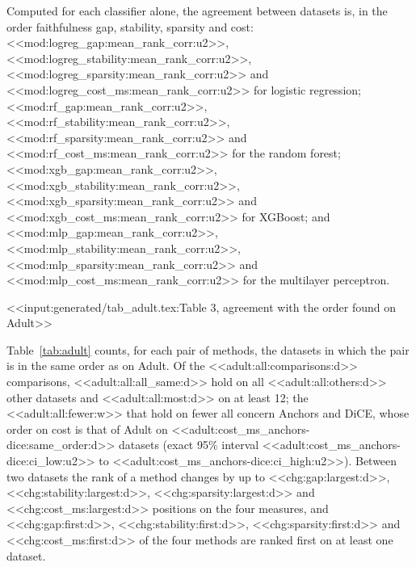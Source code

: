 \documentclass[10pt,a4paper,twocolumn]{article}
\begin{document}
Computed for each classifier alone, the agreement between datasets is, in the order
faithfulness gap, stability, sparsity and cost: <<mod:logreg_gap:mean_rank_corr:u2>>,
<<mod:logreg_stability:mean_rank_corr:u2>>, <<mod:logreg_sparsity:mean_rank_corr:u2>> and
<<mod:logreg_cost_ms:mean_rank_corr:u2>> for logistic regression;
<<mod:rf_gap:mean_rank_corr:u2>>, <<mod:rf_stability:mean_rank_corr:u2>>,
<<mod:rf_sparsity:mean_rank_corr:u2>> and <<mod:rf_cost_ms:mean_rank_corr:u2>> for the
random forest; <<mod:xgb_gap:mean_rank_corr:u2>>, <<mod:xgb_stability:mean_rank_corr:u2>>,
<<mod:xgb_sparsity:mean_rank_corr:u2>> and <<mod:xgb_cost_ms:mean_rank_corr:u2>> for
XGBoost; and <<mod:mlp_gap:mean_rank_corr:u2>>, <<mod:mlp_stability:mean_rank_corr:u2>>,
<<mod:mlp_sparsity:mean_rank_corr:u2>> and <<mod:mlp_cost_ms:mean_rank_corr:u2>> for the
multilayer perceptron.

<<input:generated/tab_adult.tex:Table 3, agreement with the order found on Adult>>

Table~\ref{tab:adult} counts, for each pair of methods, the datasets in which the pair is
in the same order as on Adult. Of the <<adult:all:comparisons:d>> comparisons,
<<adult:all:all_same:d>> hold on all <<adult:all:others:d>> other datasets and
<<adult:all:most:d>> on at least 12; the <<adult:all:fewer:w>> that hold on fewer all
concern Anchors and DiCE, whose order on cost is that of Adult on
<<adult:cost_ms_anchors-dice:same_order:d>> datasets (exact 95\% interval
<<adult:cost_ms_anchors-dice:ci_low:u2>> to <<adult:cost_ms_anchors-dice:ci_high:u2>>).
Between two
datasets the rank of a method changes by up to <<chg:gap:largest:d>>,
<<chg:stability:largest:d>>, <<chg:sparsity:largest:d>> and <<chg:cost_ms:largest:d>>
positions on the four measures, and <<chg:gap:first:d>>, <<chg:stability:first:d>>,
<<chg:sparsity:first:d>> and <<chg:cost_ms:first:d>> of the four methods are ranked first
on at least one dataset.
\end{document}
